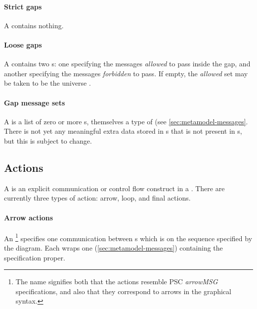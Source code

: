 \paragraph{Strict gaps}

A \mstrictgap{} contains nothing.

\paragraph{Loose gaps}

A \mloosegap{} contains two \mgapmessageset s: one specifying the messages
\emph{allowed} to pass inside the gap, and another specifying the messages
\emph{forbidden} to pass.  If empty, the \emph{allowed} set may be taken to be
the universe .

\paragraph{Gap message sets}

A \mgapmessageset{} is a list of zero or more \mgapmessagespec s, themselves
a type of \mmessagespec{} (see \cref{sec:metamodel-messages}.
There is not yet any meaningful extra data stored in
\mgapmessagespec s that is not present in \mmessagespec s, but this is subject
to change.

\subsection{Actions}\label{sec:metamodel-sequences-actions}

A \msequenceaction{} is an explicit communication or control flow construct in a
\msubsequence.  There are currently three types of action: arrow, loop, and
final actions.

\paragraph{Arrow actions}

An \marrowaction\footnote{The name signifies both that the actions resemble
PSC \emph{arrowMSG} specifications, and also that they correspond to arrows in
the graphical syntax.} specifies one communication between \mactor s which is on
the sequence specified by the diagram.  Each \marrowaction{} wraps one
\marrowmessagespec{} (\cref{sec:metamodel-messages})
containing the specification proper.


